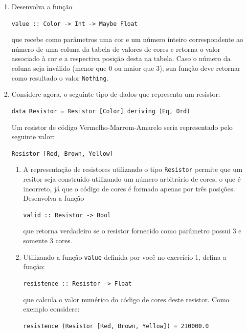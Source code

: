 \documentclass[11pt,a4paper]{article}
\begin{document}
\begin{enumerate}

    \item Desenvolva a fun\c{c}\~ao
    \begin{center}
        \texttt{value :: Color -> Int -> Maybe Float}
    \end{center}    
    que recebe como par\^ametros uma cor e um n\'umero inteiro correspondente ao n\'umero de uma coluna da tabela de valores de cores e retorna
    o valor associado \`a cor e a respectiva posi\c{c}\~ao desta na tabela. Caso o n\'umero da coluna seja inv\'alido (menor que $0$ ou maior que $3$),
    sua fun\c{c}\~ao deve retornar como resultado o valor \texttt{Nothing}.
    \item Considere agora, o seguinte tipo de dados que representa um resistor:
    \begin{center}
       \texttt{data Resistor = Resistor [Color] deriving (Eq, Ord)}
    \end{center}
    Um resistor de c\'odigo Vermelho-Marrom-Amarelo seria representado pelo seguinte valor:
    \begin{center}
       \texttt{Resistor [Red, Brown, Yellow]}
    \end{center}
    \begin{enumerate}
	\item A representa\c{c}\~ao de resistores utilizando o tipo \texttt{Resistor} permite que um resitor seja constru\'ido utilizando um 
              n\'umero arbitr\'ario de cores, o que \'e incorreto, j\'a que o c\'odigo de cores \'e formado apenas por tr\^es posi\c{c}\~oes.
              Desenvolva a fun\c{c}\~ao
              \begin{center}
                   \texttt{valid :: Resistor -> Bool}
              \end{center}
              que retorna verdadeiro se o resistor fornecido como par\^ametro possui $3$ e somente $3$ cores.
        \item Utilizando a fun\c{c}\~ao \texttt{value} definida por voc\^e no exerc\'icio 1, defina a fun\c{c}\~ao:
              \begin{center}
                   \texttt{resistence :: Resistor -> Float}
              \end{center}
              que calcula o valor num\'erico do c\'odigo de cores deste resistor. Como exemplo considere:
              \begin{center}
		   \texttt{resistence (Resistor [Red, Brown, Yellow]) = 210000.0}
              \end{center}

\end{enumerate}
\end{enumerate}
\end{document}

